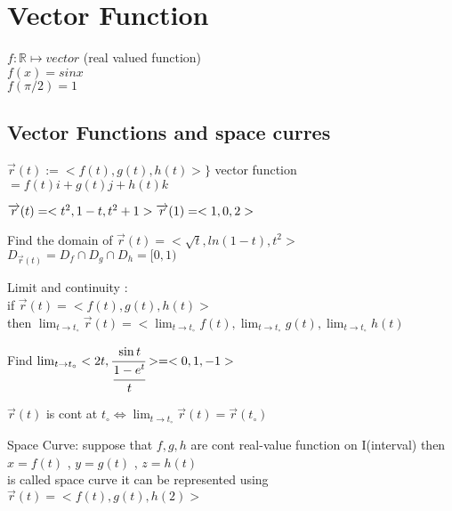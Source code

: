 \chapter{Vector Function}
$f:\mathbb{R}\mapsto vector$ (real valued function)\\
$f(x)=sinx$\\
$f(\pi/2)=1$\\
\section{Vector Functions and space curres}
$\overrightarrow{r}(t):=<f(t),g(t),h(t)>\}$ vector function \\
$=f(t)i+g(t)j+h(t)k$\\
\noindent{\color{smalt(darkpowderblue)}\rule{\linewidth}{.2mm}}
\begin{example}
$\overrightarrow{r}(t)=<t^2,1-t,t^2+1>\\ \overrightarrow{r}(1)=<1,0,2>$
\end{example}
\noindent{\color{smalt(darkpowderblue)}\rule{\linewidth}{.2mm}}
\begin{example}
Find the domain of $\overrightarrow{r}(t)=<\sqrt{t},ln(1-t),t^2>$\\
$D_{\overrightarrow{r}(t)}=D_f\cap D_g\cap D_h=[0,1)$
\end{example}
\noindent{\color{smalt(darkpowderblue)}\rule{\linewidth}{.2mm}}
Limit and continuity :\\
if $\overrightarrow{r}(t)=<f(t),g(t),h(t)>$\\
then $\lim_{t\to t_\circ}\overrightarrow{r}(t)=<\lim_{t\to t_\circ}f(t),\lim_{t\to t_\circ}g(t),\lim_{t\to t_\circ}h(t)$\\
\noindent{\color{smalt(darkpowderblue)}\rule{\linewidth}{.2mm}}
\begin{example}
Find $\lim_{t\to t_\circ}<2t,\cfrac{\sin{t}}{\cfrac{1-e^t}{t}}>=<0,1,-1>$
\end{example}
\noindent{\color{smalt(darkpowderblue)}\rule{\linewidth}{.2mm}}
$\overrightarrow{r}(t)$ is cont at $t_\circ\Leftrightarrow\lim_{t\rightarrow t_\circ}\overrightarrow{r}(t)=\overrightarrow{r}(t_\circ)$\\
\begin{definition}
Space Curve: suppose that $f,g,h$ are cont real-value function on I(interval) then \\
$x=f(t)$ , $y=g(t)$ , $z=h(t)$\\
is called space curve it can be represented using $\overrightarrow{r}(t)=<f(t),g(t),h(2)>$
\end{definition}
